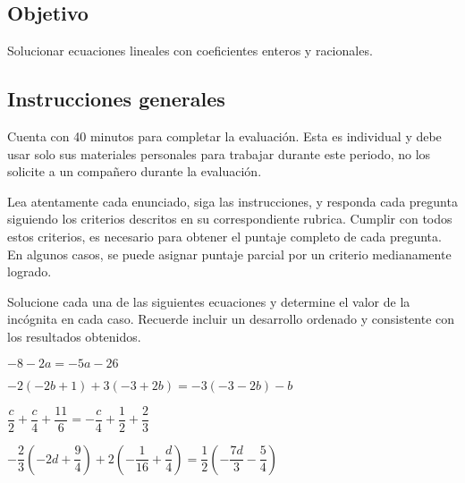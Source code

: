 \documentclass[]{srs2}
\begin{document}
\subsection*{Objetivo}
  Solucionar ecuaciones lineales con coeficientes enteros y racionales.

\subsection*{Instrucciones generales}
  Cuenta con 40 minutos para completar la evaluación. Esta es individual y debe usar solo
  sus materiales personales para trabajar durante este periodo, no los solicite a un compañero
  durante la evaluación.

  Lea atentamente cada enunciado, siga las instrucciones, y responda cada
  pregunta siguiendo los criterios descritos en su correspondiente rubrica. Cumplir
  con todos estos criterios, es necesario para obtener el puntaje completo de cada pregunta.
  En algunos casos, se puede asignar puntaje parcial por un criterio medianamente logrado.

\separador[2mm]

  Solucione cada una de las siguientes ecuaciones y determine el valor de la incógnita
  en cada caso. Recuerde incluir un desarrollo ordenado y consistente con los resultados
  obtenidos.

\begin{preguntas}
  \pregunta $-8-2a=-5a-26$
  \begin{malla}[7]
  \end{malla}
  \usebox{\rubricaUno}

  \pregunta $-2\left(-2b+1\right)+3\left(-3+2b\right)=-3\left(-3-2b\right)-b$
  \begin{malla}[7]
  \end{malla}
  \usebox{\rubricaUno}

  \pregunta $\dfrac{c}{2}+ \dfrac{c}{4} + \dfrac{11}{6}= -\dfrac{c}{4} + \dfrac{1}{2} + \dfrac{2}{3}$
  \begin{malla}[8]
  \end{malla}
  \usebox{\rubricaUno}

  \pregunta $-\dfrac{2}{3}\left(-2d+\dfrac{9}{4}\right) + 2\left(-\dfrac{1}{16}+\dfrac{d}{4}\right)= \dfrac{1}{2}\left(-\dfrac{7d}{3}-\dfrac{5}{4}\right)$
  \begin{malla}[12]
  \end{malla}
  \usebox{\rubricaUno}



\end{preguntas}
\end{document}
